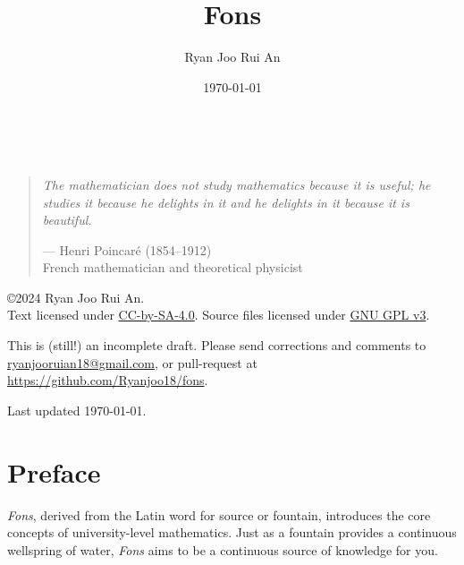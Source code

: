 \documentclass[12pt,a4 paper]{extreport}
\begin{document}
\begin{titlepage}
\title{\sffamily\bfseries Fons}
\author{Ryan Joo Rui An}
\date{\today}

\vfill
{}
\vfill
\vfill
\end{titlepage}

\maketitle
\pagebreak

\

\vfill

\begin{quote}
\textit{The mathematician does not study mathematics because it is useful; he studies it because he delights in it and he delights in it because it is beautiful.}

\begin{flushright}--- Henri Poincar\'{e} (1854--1912)\\
French mathematician and theoretical physicist\end{flushright}
\end{quote}

\vfill

\copyright 2024 Ryan Joo Rui An.\\
Text licensed under \href{https://creativecommons.org/licenses/by-sa/4.0/}{CC-by-SA-4.0}. Source files licensed under \href{https://choosealicense.com/licenses/gpl-3.0/}{GNU GPL v3}.

This is (still!) an incomplete draft. Please send corrections and comments to \url{ryanjooruian18@gmail.com}, or pull-request at \url{https://github.com/Ryanjoo18/fons}.

Last updated \today.
\thispagestyle{empty}

\chapter*{Preface}
\emph{Fons}, derived from the Latin word for source or fountain, introduces the core concepts of university-level mathematics. Just as a fountain provides a continuous wellspring of water, \emph{Fons} aims to be a continuous source of knowledge for you.
\end{document}

